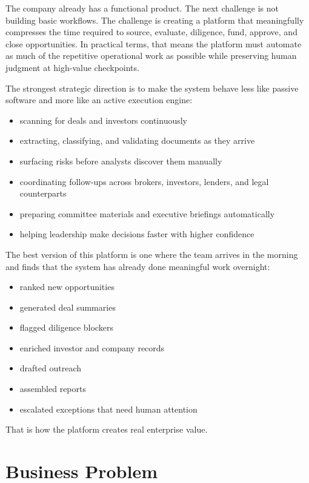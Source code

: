 \documentclass[11pt]{article}
\begin{document}
The company already has a functional product. The next challenge is not building basic workflows. The challenge is creating a platform that meaningfully compresses the time required to source, evaluate, diligence, fund, approve, and close opportunities. In practical terms, that means the platform must automate as much of the repetitive operational work as possible while preserving human judgment at high-value checkpoints.

The strongest strategic direction is to make the system behave less like passive software and more like an active execution engine:

\begin{itemize}
\item scanning for deals and investors continuously
\item extracting, classifying, and validating documents as they arrive
\item surfacing risks before analysts discover them manually
\item coordinating follow-ups across brokers, investors, lenders, and legal counterparts
\item preparing committee materials and executive briefings automatically
\item helping leadership make decisions faster with higher confidence
\end{itemize}

The best version of this platform is one where the team arrives in the morning and finds that the system has already done meaningful work overnight:

\begin{itemize}
\item ranked new opportunities
\item generated deal summaries
\item flagged diligence blockers
\item enriched investor and company records
\item drafted outreach
\item assembled reports
\item escalated exceptions that need human attention
\end{itemize}

That is how the platform creates real enterprise value.

\section{Business Problem}
\end{document}
